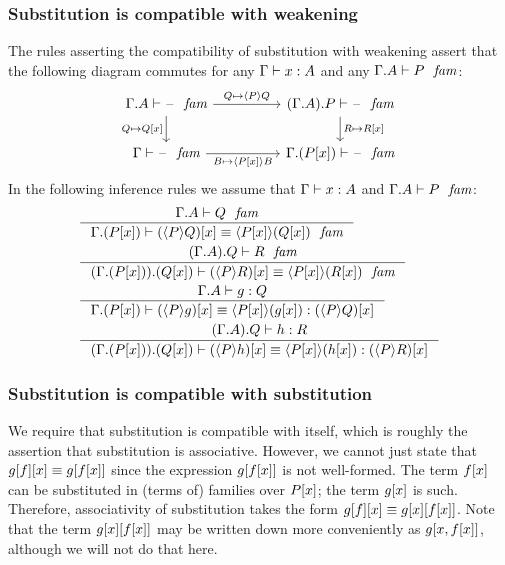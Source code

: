 \subsubsection{Substitution is compatible with weakening}\label{comp-sw}
The rules asserting the compatibility of substitution with weakening assert
that the following diagram commutes for any $\jterm{\Gamma}{A}{x}$ and any
$\jfam{\ctxext{\Gamma}{A}}{P}$:
\begin{equation*}
\begin{tikzcd}[column sep=huge]
\jfam{\ctxext{\Gamma}{A}}{\blank} \ar{d}[swap]{Q\mapsto\subst{x}{Q}} \ar{r}{Q\mapsto\ctxwk{P}{Q}} & \jfam{\ctxext{{\Gamma}{A}}{P}}{\blank} \ar{d}{R\mapsto\subst{x}{R}}\\ 
\jfam{\Gamma}{\blank} \ar{r}[swap]{B\mapsto\ctxwk{\subst{x}{P}}{B}} & \jfam{\ctxext{\Gamma}{\subst{x}{P}}}{\blank}
\end{tikzcd}
\end{equation*}
In the following inference rules we assume that $\jterm{\Gamma}{A}{x}$ and
$\jfam{\ctxext{\Gamma}{A}}{P}$:
\begin{align}
& \inference
    {\jfam{\ctxext{\Gamma}{A}}{Q}}
    {\jfameq{\ctxext{\Gamma}{\subst{x}{P}}}{\subst{x}{\ctxwk{P}{Q}}}{\ctxwk{\subst{x}{P}}{\subst{x}{Q}}}}\\
& \inference
    {\jfam{\ctxext{{\Gamma}{A}}{Q}}{R}}
    {\jfameq{\ctxext{{\Gamma}{\subst{x}{P}}}{\subst{x}{Q}}}{\subst{x}{\ctxwk{P}{R}}}{\ctxwk{\subst{x}{P}}{\subst{x}{R}}}}\\
& \inference
    {\jterm{\ctxext{\Gamma}{A}}{Q}{g}}
    {\jtermeq
      {\ctxext{\Gamma}{\subst{x}{P}}}
      {\subst{x}{\ctxwk{P}{Q}}}
      {\subst{x}{\ctxwk{P}{g}}}
      {\ctxwk{\subst{x}{P}}{\subst{x}{g}}}}\\
& \inference
    {\jterm{\ctxext{{\Gamma}{A}}{Q}}{R}{h}}
    {\jtermeq
      {\ctxext{{\Gamma}{\subst{x}{P}}}{\subst{x}{Q}}}
      {\subst{x}{\ctxwk{P}{R}}}
      {\subst{x}{\ctxwk{P}{h}}}
      {\ctxwk{\subst{x}{P}}{\subst{x}{h}}}}
\end{align}

\subsubsection{Substitution is compatible with substitution}\label{comp-ss}

We require that substitution is compatible with itself, which is roughly the
assertion that substitution is associative. However, we cannot just state that
$\subst{x}{{f}{g}}\jdeq\subst{{x}{f}}{g}$ since the expression $\subst{{x}{f}}{g}$
is not well-formed. The term $\subst{x}{f}$ can be substituted in (terms of) families over
$\subst{x}{P}$; the term $\subst{x}{g}$ is such. Therefore, associativity of
substitution takes the form $\subst{x}{{f}{g}}\jdeq\subst{{x}{f}}{{x}{g}}$.
Note that the term $\subst{{x}{f}}{{x}{g}}$ may be written down more conveniently
as $\subst{x,\subst{x}{f}}{g}$, although we will not do that here.

